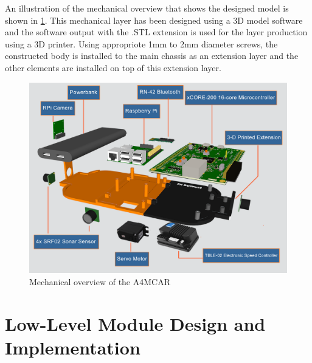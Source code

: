 An illustration of the mechanical overview that shows the designed model is shown in \ref{fig:mechanicaloverview}. This mechanical layer has been designed using a 3D model software and the software output with the .STL extension is used for the layer production using a 3D printer. Using appropriote 1mm to 2mm diameter screws, the constructed body is installed to the main chassis as an extension layer and the other elements are installed on top of this extension layer. 
\newpage
\begin{figure}[!ht]
	\includegraphics[scale=0.25]{content/images/mechanicaloverview.png}
	\caption{Mechanical overview of the A4MCAR}
	\label{fig:mechanicaloverview}
\end{figure}

\section{Low-Level Module Design and Implementation}
